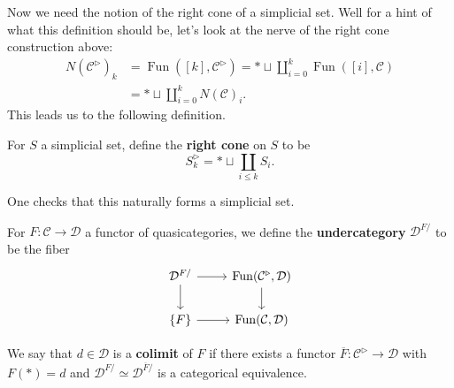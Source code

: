 \documentclass{amsart}
\DeclareMathOperator{\Fun}{Fun}
\begin{document}
Now we need the notion of the right cone of a simplicial set. Well for a hint
of what this definition should be, let's look at the nerve of the right cone construction
above:
\begin{align*}
    N(\mathcal{C}^\triangleright)_k &= \Fun([k],\mathcal{C}^\triangleright) = *\sqcup \coprod_{i=0}^k\Fun([i],\mathcal{C}) \\
    &= *\sqcup \coprod_{i=0}^k N(\mathcal{C})_i.
\end{align*}
This leads us to the following definition.
\begin{definition}
    For $S$ a simplicial set, define the \textbf{right cone} on $S$ to be
    \begin{equation*}
        S^\triangleright_k =* \sqcup  \coprod_{i\leqslant k}S_i.
    \end{equation*}
\end{definition}
One checks that this naturally forms a simplicial set.

\begin{definition}
    For $F:\mathcal{C}\to \mathcal{D}$ a functor of quasicategories, we define
    the \textbf{undercategory} $\mathcal{D}^{F/}$ to be the fiber
    \begin{equation*}
        \begin{tikzcd}
            \mathcal{D}^{F/} \rar\dar & \Fun(\mathcal{C}^\triangleright,\mathcal{D})\dar\\
            \{F\} \rar & \Fun(\mathcal{C},\mathcal{D})
        \end{tikzcd}
    \end{equation*}
\end{definition}

\begin{definition}
    We say that $d\in \mathcal{D}$ is a \textbf{colimit} of $F$ if there exists a functor
    $\overline F:\mathcal{C}^\triangleright\to \mathcal{D}$ with $F(*)=d$ and
    $\mathcal{D}^{F/}\simeq \mathcal{D}^{\overline F/}$ is a categorical equivalence.
\end{definition}
\end{document}
